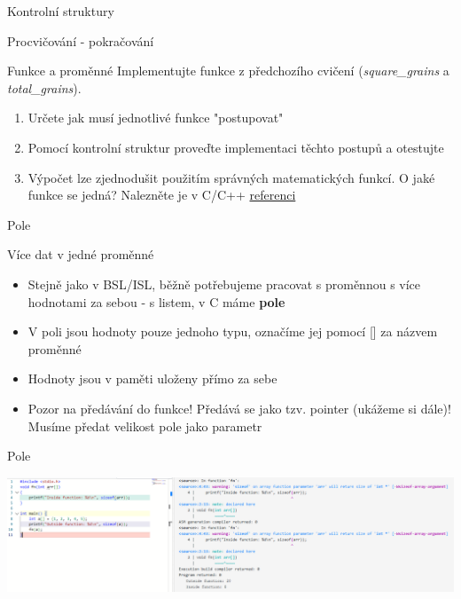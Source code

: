 \documentclass[9pt]{beamer}
\begin{document}
\begin{frame}{Kontrolní struktury}
    
\end{frame}

\begin{frame}{Procvičování - pokračování}
    \begin{block}{Funkce a proměnné}
    Implementujte funkce z předchozího cvičení (\textit{square\_grains} a \textit{total\_grains}).
    \begin{enumerate}
        \item Určete jak musí jednotlivé funkce "postupovat"
        \item Pomocí kontrolní struktur proveďte implementaci těchto postupů a otestujte
        \item Výpočet lze zjednodušit použitím správných matematických funkcí. O jaké funkce se jedná? Nalezněte je v C/C++ \href{https://en.cppreference.com}{referenci}
    \end{enumerate}
    \end{block}
\end{frame}

\begin{frame}{Pole}
    \begin{block}{Více dat v jedné proměnné}
        \begin{itemize}
            \item Stejně jako v BSL/ISL, běžně potřebujeme pracovat s proměnnou s více hodnotami za sebou - s listem, v C máme \textbf{pole}
            \item V poli jsou hodnoty pouze jednoho typu, označíme jej pomocí [] za názvem proměnné
            \item Hodnoty jsou v paměti uloženy přímo za sebe
            \item Pozor na předávání do funkce! Předává se jako tzv. pointer (ukážeme si dále)! Musíme předat velikost pole jako parametr
        \end{itemize}
    \end{block}
    
\end{frame}

\begin{frame}{Pole}
    
    \begin{center}
        \includegraphics[width=0.99\linewidth]{lekce20/arr_outside_inside.png}
    \end{center}
\end{frame}
\end{document}
